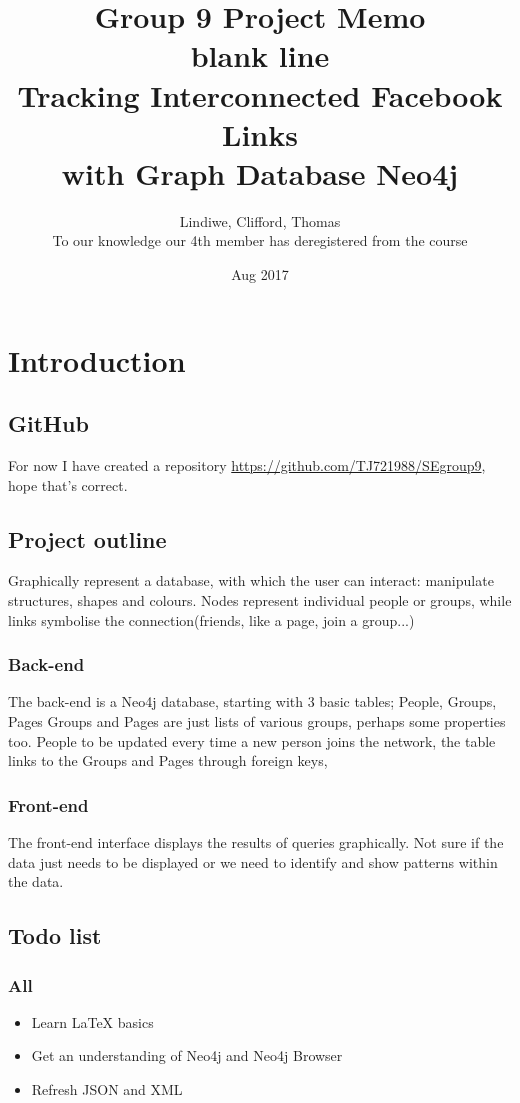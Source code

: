 \documentclass[11pt]{article}
\title{%
Group 9 Project Memo\\\large
\color{white} blank line\\
\color{black}
Tracking Interconnected Facebook Links\\
with Graph Database Neo4j}
\date{Aug 2017}
\author{Lindiwe, Clifford, Thomas\\
To our knowledge our 4th member has deregistered from the course}
\begin{document}
\maketitle
{}
\newpage
\tableofcontents
\newpage
{}
\section{Introduction}
\subsection{GitHub}
For now I have created a repository \url{https://github.com/TJ721988/SEgroup9}, hope that's correct.

\subsection{Project outline}
Graphically represent a database, with which the user can interact: manipulate structures, shapes and colours. 
Nodes represent individual people or groups, while links symbolise the connection(friends, like a page, join a group...)
\subsubsection{Back-end}
The back-end is a Neo4j database, starting with 3 basic tables; People, Groups, Pages
Groups and Pages are just lists of various groups, perhaps some properties too.
People to be updated every time a new person joins the network, the table links to the Groups and Pages through foreign keys,

\subsubsection{Front-end}
The front-end interface displays the results of queries graphically. 
Not sure if the data just needs to be displayed or we need to identify and show patterns within the data. 

\subsection{Todo list}
\subsubsection{All}
\begin{itemize}
\item Learn LaTeX basics
\item Get an understanding of Neo4j and Neo4j Browser
\item Refresh JSON and XML

\end{itemize}
\end{document}
